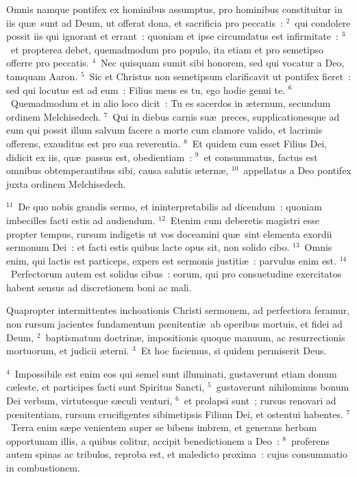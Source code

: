 \bchapter
\lettrine[lines=3,image=true,loversize=0.05,lraise=-0.03]{O}{}mnis namque pontifex ex hominibus assumptus, pro hominibus constituitur in iis qu\ae\ sunt ad Deum, ut offerat dona, et sacrificia pro peccatis~:
${}^{2}$~qui condolere possit iis qui ignorant et errant~: quoniam et ipse circumdatus est infirmitate~:
${}^{3}$~et propterea debet, quemadmodum pro populo, ita etiam et pro semetipso offerre pro peccatis.
${}^{4}$~Nec quisquam sumit sibi honorem, sed qui vocatur a Deo, tamquam Aaron.
${}^{5}$~Sic et Christus non semetipsum clarificavit ut pontifex fieret~: sed qui locutus est ad eum~: Filius meus es tu, ego hodie genui te.
${}^{6}$~Quemadmodum et in alio loco dicit~: Tu es sacerdos in \ae ternum, secundum ordinem Melchisedech.
${}^{7}$~Qui in diebus carnis su\ae\ preces, supplicationesque ad eum qui possit illum salvum facere a morte cum clamore valido, et lacrimis offerens, exauditus est pro sua reverentia.
${}^{8}$~Et quidem cum esset Filius Dei, didicit ex iis, qu\ae\ passus est, obedientiam~:
${}^{9}$~et consummatus, factus est omnibus obtemperantibus sibi, causa salutis \ae tern\ae ,
${}^{10}$~appellatus a Deo pontifex juxta ordinem Melchisedech.


${}^{11}$~De quo nobis grandis sermo, et ininterpretabilis ad dicendum~: quoniam imbecilles facti estis ad audiendum.
${}^{12}$~Etenim cum deberetis magistri esse propter tempus, rursum indigetis ut vos doceamini qu\ae\ sint elementa exordii sermonum Dei~: et facti estis quibus lacte opus sit, non solido cibo.
${}^{13}$~Omnis enim, qui lactis est particeps, expers est sermonis justiti\ae~: parvulus enim est.
${}^{14}$~Perfectorum autem est solidus cibus~: eorum, qui pro consuetudine exercitatos habent sensus ad discretionem boni ac mali.

\bchapter
\lettrine[lines=3,image=true,loversize=0.05,lraise=-0.03]{Q}{}uapropter intermittentes inchoationis Christi sermonem, ad perfectiora feramur, non rursum jacientes fundamentum pœnitenti\ae\ ab operibus mortuis, et fidei ad Deum,
${}^{2}$~baptismatum doctrin\ae , impositionis quoque manuum, ac resurrectionis mortuorum, et judicii \ae terni.
${}^{3}$~Et hoc faciemus, si quidem permiserit Deus.


${}^{4}$~Impossibile est enim eos qui semel sunt illuminati, gustaverunt etiam donum c\ae leste, et participes facti sunt Spiritus Sancti,
${}^{5}$~gustaverunt nihilominus bonum Dei verbum, virtutesque s\ae culi venturi,
${}^{6}$~et prolapsi sunt~; rursus renovari ad pœnitentiam, rursum crucifigentes sibimetipsis Filium Dei, et ostentui habentes.
${}^{7}$~Terra enim s\ae pe venientem super se bibens imbrem, et generans herbam opportunam illis, a quibus colitur, accipit benedictionem a Deo~:
${}^{8}$~proferens autem spinas ac tribulos, reproba est, et maledicto proxima~: cujus consummatio in combustionem.


